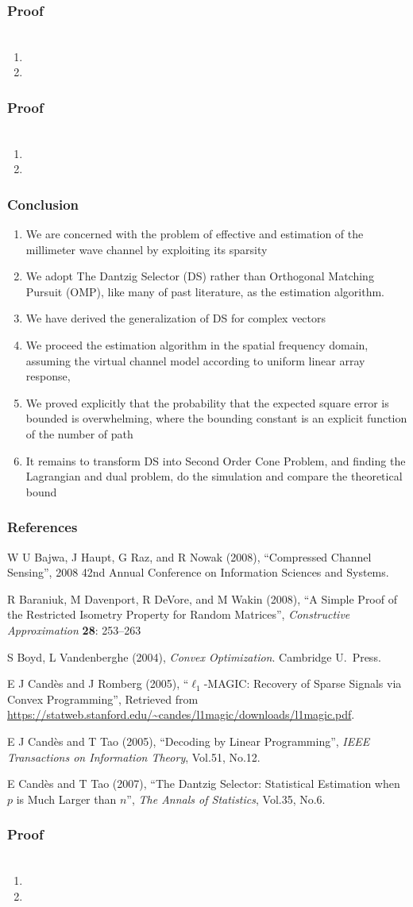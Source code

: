 \documentclass{beamer}
\newcommand{\Disp}[1]{\begin{align} #1 \end{align}}
\newcommand{\I}{\item}
\begin{document}
\begin{frame}
\frametitle{Proof}
\Disp{
}
\begin{enumerate}
\I 
\I 
\end{enumerate}
\end{frame}


\begin{frame}
\frametitle{Proof}
\Disp{
}
\begin{enumerate}
\I 
\I 
\end{enumerate}
\end{frame}

\begin{frame}
\frametitle{Conclusion}
\begin{enumerate}
\I We are concerned with the problem of effective and estimation of the millimeter wave channel by exploiting its sparsity
\I We adopt The Dantzig Selector (DS) rather than Orthogonal Matching Pursuit (OMP), like many of past literature, as the estimation algorithm.
\I We have derived the generalization of DS for complex vectors
\I We proceed the estimation algorithm in the spatial frequency domain, assuming the virtual channel model according to uniform linear array response, 
\I We proved explicitly that the probability that the expected square error is bounded is overwhelming, where the bounding constant is an explicit function of the number of path
\I It remains to transform DS into Second Order Cone Problem, and finding the Lagrangian and dual problem, do the simulation and compare the theoretical bound
\end{enumerate}
\end{frame}

\begin{frame}
\frametitle{References}
\begin{enumerate}
{ \small
\item W U Bajwa, J Haupt, G Raz, and R Nowak (2008), ``Compressed Channel Sensing'', 2008 42nd Annual Conference on Information Sciences and Systems.
\item R Baraniuk, M Davenport, R DeVore, and M Wakin (2008), ``A Simple Proof of the Restricted Isometry Property for Random Matrices'', \textit{Constructive Approximation} \textbf{28}: 253–263
\item S Boyd, L Vandenberghe (2004), \textit{Convex Optimization}. Cambridge U.\ Press.
\item E J Cand\`es and J Romberg (2005), ``\(\ell_1\)-MAGIC: Recovery of Sparse Signals via Convex Programming'', Retrieved from \url{https://statweb.stanford.edu/~candes/l1magic/downloads/l1magic.pdf}.
\item E J Cand\`es and T Tao (2005), ``Decoding by Linear Programming'', \textit{IEEE Transactions on Information Theory}, Vol.51, No.12.
\item E Cand\`es and T Tao (2007), ``The Dantzig Selector: Statistical Estimation when \(p\) is Much Larger than \(n\)'', \textit{The Annals of Statistics}, Vol.35, No.6.
}
\end{enumerate}
\end{frame}


\begin{frame}
\frametitle{Proof}
\Disp{
}
\begin{enumerate}
\I 
\I 
\end{enumerate}
\end{frame}



\end{document}
